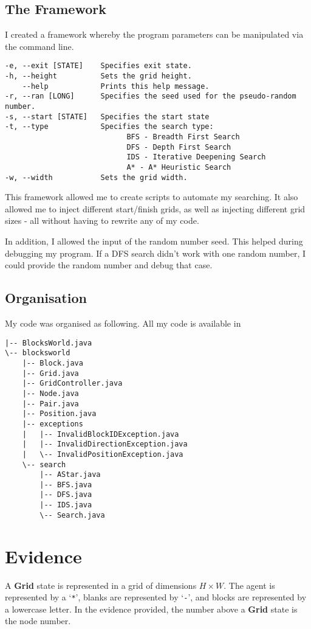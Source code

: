 \documentclass[a4paper]{article}
\def \grid {\textbf{Grid}}
\begin{document}
\subsection{The Framework}
I created a framework whereby the program parameters can be manipulated via the command line.
\begin{lstlisting}
-e, --exit [STATE]    Specifies exit state.
-h, --height          Sets the grid height.
    --help            Prints this help message.
-r, --ran [LONG]      Specifies the seed used for the pseudo-random number.
-s, --start [STATE]   Specifies the start state
-t, --type            Specifies the search type:
                    		BFS - Breadth First Search
                    		DFS - Depth First Search
                    		IDS - Iterative Deepening Search
                    		A* - A* Heuristic Search
-w, --width           Sets the grid width.
\end{lstlisting}
This framework allowed me to create scripts to automate my searching.
It also allowed me to inject different start/finish grids, as well as injecting different grid sizes - all without having to rewrite any of my code.

In addition, I allowed the input of the random number seed.
This helped during debugging my program.
If a DFS search didn't work with one random number, I could provide the random number and debug that case.

\subsection{Organisation}
My code was organised as following.
All my code is available in 
\begin{lstlisting}
|-- BlocksWorld.java
\-- blocksworld
    |-- Block.java
    |-- Grid.java
    |-- GridController.java
    |-- Node.java
    |-- Pair.java
    |-- Position.java
    |-- exceptions
    |   |-- InvalidBlockIDException.java
    |   |-- InvalidDirectionException.java
    |   \-- InvalidPositionException.java
    \-- search
        |-- AStar.java
        |-- BFS.java
        |-- DFS.java
        |-- IDS.java
        \-- Search.java
\end{lstlisting}
\section{Evidence}
A {\grid} state is represented in a grid of dimensions $H \times W$.
The agent is represented by a `\texttt{*}', blanks are represented by `\texttt{-}', and blocks are represented by a lowercase letter.
In the evidence provided, the number above a {\grid} state is the node number.
\end{document}
